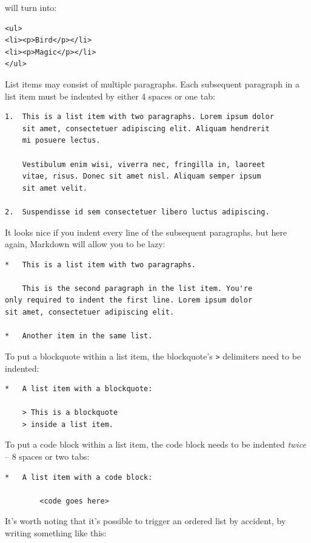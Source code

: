 will turn into:

\begin{verbatim}
<ul>
<li><p>Bird</p></li>
<li><p>Magic</p></li>
</ul>
\end{verbatim}

List items may consist of multiple paragraphs. Each subsequent
paragraph in a list item must be indented by either 4 spaces
or one tab:

\begin{verbatim}
1.  This is a list item with two paragraphs. Lorem ipsum dolor
    sit amet, consectetuer adipiscing elit. Aliquam hendrerit
    mi posuere lectus.

    Vestibulum enim wisi, viverra nec, fringilla in, laoreet
    vitae, risus. Donec sit amet nisl. Aliquam semper ipsum
    sit amet velit.

2.  Suspendisse id sem consectetuer libero luctus adipiscing.
\end{verbatim}

It looks nice if you indent every line of the subsequent
paragraphs, but here again, Markdown will allow you to be
lazy:

\begin{verbatim}
*   This is a list item with two paragraphs.

    This is the second paragraph in the list item. You're
only required to indent the first line. Lorem ipsum dolor
sit amet, consectetuer adipiscing elit.

*   Another item in the same list.
\end{verbatim}

To put a blockquote within a list item, the blockquote's \texttt{>}
delimiters need to be indented:

\begin{verbatim}
*   A list item with a blockquote:

    > This is a blockquote
    > inside a list item.
\end{verbatim}

To put a code block within a list item, the code block needs
to be indented \emph{twice} -- 8 spaces or two tabs:

\begin{verbatim}
*   A list item with a code block:

        <code goes here>
\end{verbatim}

It's worth noting that it's possible to trigger an ordered list by
accident, by writing something like this:

